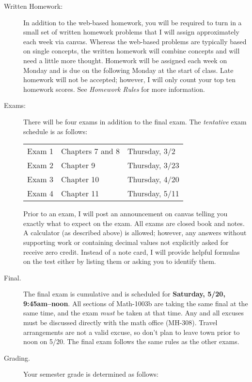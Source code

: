 \documentclass[letterpaper,12pt,fleqn]{article}
\begin{document}
\begin{description}
\item[Written Homework:] In addition to the web-based homework, you will be
  required to turn in a small set of written homework problems that I will
  assign approximately each week via canvas. Whereas the web-based problems are
  typically based on single concepts, the written homework will combine
  concepts and will need a little more thought. Homework will be assigned each
  week on Monday and is due on the following Monday at the start of class. Late
  homework will not be accepted; however, I will only count your top ten
  homework scores. See \emph{Homework Rules} for more information.

\item[Exams:] There will be four exams in addition to the final exam. The
  \emph{tentative} exam schedule is as follows:

  \bigskip

  \begin{tabular}{lll}
    Exam 1 & Chapters 7 and 8 & Thursday, 3/2 \\
    Exam 2 & Chapter 9 & Thursday, 3/23 \\
    Exam 3 & Chapter 10 & Thursday, 4/20 \\
    Exam 4 & Chapter 11 & Thursday, 5/11 \\
  \end{tabular}
  
  \bigskip

  Prior to an exam, I will post an announcement on canvas telling you exactly what to
  expect on the exam. All exams are closed book and notes. A calculator (as described
  above) is allowed; however, any answers without supporting work or containing decimal
  values not explicitly asked for receive zero credit. Instead of a note card, I will
  provide helpful formulas on the test either by listing them or asking you to identify
  them.

\item[Final.] The final exam is cumulative and is scheduled for
  \textbf{Saturday, 5/20, 9:45am--noon}.  All sections of Math-1003b are taking
  the same final at the same time, and the exam \emph{must} be taken at that time.
  Any and all excuses must be discussed directly with the math office (MH-308).
  Travel arrangements are not a valid excuse, so don't plan to leave town prior
  to noon on 5/20.  The final exam follows the same rules as the other exams.

\item[Grading.]  Your semester grade is determined as follows:


\end{description}
\end{document}
